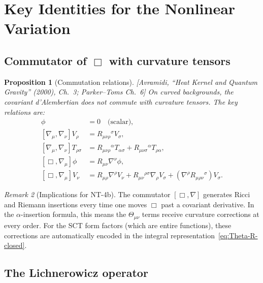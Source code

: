 \documentclass[12pt,a4paper]{article}
\newtheorem{proposition}{Proposition}[section]
\theoremstyle{definition}
\theoremstyle{remark}
\newtheorem{remark}[proposition]{Remark}
\newcommand{\fromlit}[1]{\textcolor{blue!70!black}{\textsf{[#1]}}}
\begin{document}
\section{Key Identities for the Nonlinear Variation}
\label{sec:identities}

\subsection{Commutator of $\Box$ with curvature tensors}

\begin{proposition}[Commutation relations]
\label{prop:commutators}
\fromlit{Avramidi, ``Heat Kernel and Quantum Gravity'' (2000), Ch.~3;
Parker--Toms Ch.~6}
On curved backgrounds, the covariant d'Alembertian does not commute
with curvature tensors.  The key relations are:
\begin{align}
  [\nabla_\mu, \nabla_\nu]\phi &= 0
    \quad\text{(scalar)},
  \label{eq:comm-scalar}\\
  [\nabla_\mu, \nabla_\nu]V_\rho &= R_{\mu\nu\rho}{}^\sigma V_\sigma,
  \label{eq:comm-vector}\\
  [\nabla_\mu, \nabla_\nu]T_{\rho\sigma}
  &= R_{\mu\nu\rho}{}^\alpha T_{\alpha\sigma}
    + R_{\mu\nu\sigma}{}^\alpha T_{\rho\alpha},
  \label{eq:comm-tensor}\\
  [\Box, \nabla_\mu]\phi
  &= R_{\mu\nu}\nabla^\nu\phi,
  \label{eq:box-nabla-scalar}\\
  [\Box, \nabla_\mu]V_\nu
  &= R_{\mu\rho}\nabla^\rho V_\nu
    + R_{\mu\nu}{}^{\rho\sigma}\nabla_\rho V_\sigma
    + (\nabla^\rho R_{\mu\rho\nu}{}^\sigma) V_\sigma.
  \label{eq:box-nabla-vector}
\end{align}
\end{proposition}

\begin{remark}[Implications for NT-4b]
The commutator $[\Box, \nabla]$ generates Ricci and Riemann insertions
every time one moves $\Box$ past a covariant derivative.  In the
$\alpha$-insertion formula, this means the $\Theta_{\mu\nu}$ terms
receive curvature corrections at every order.  For the SCT form factors
(which are entire functions), these corrections are automatically
encoded in the integral representation~\eqref{eq:Theta-R-closed}.
\end{remark}


\subsection{The Lichnerowicz operator}
\end{document}

